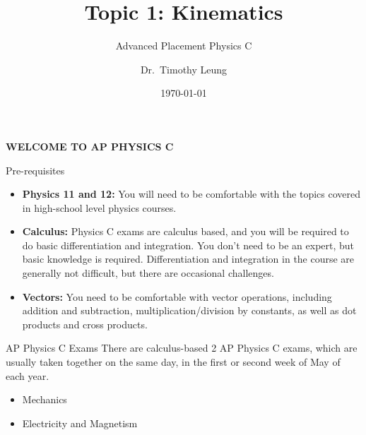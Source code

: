 \documentclass[12pt,compress,aspectratio=169]{beamer}
\title{Topic 1: Kinematics}
\subtitle{Advanced Placement Physics C}
\author[TML]{Dr.\ Timothy Leung}
\institute{Olympiads School}
\date{\today}
\begin{document}
\begin{frame}{}

  {\LARGE
    \begin{center}
      \textbf{WELCOME TO AP PHYSICS C}
    \end{center}
  }
\end{frame}



\begin{frame}{Pre-requisites}
  \begin{itemize}
  \item\textbf{Physics 11 and 12:} You will need to be comfortable with the
    topics covered in high-school level physics courses.
  \item\textbf{Calculus:} Physics C exams are calculus based, and you will be
    required to do basic differentiation and integration. You don't need to be
    an expert, but basic knowledge is required. Differentiation and integration
    in the course are generally not difficult, but there are occasional
    challenges.
  \item\textbf{Vectors:} You need to be comfortable with vector operations,
    including addition and subtraction, multiplication/division by constants,
    as well as dot products and cross products.
  \end{itemize}
\end{frame}



\begin{frame}{AP Physics C Exams}
  There are calculus-based 2 AP Physics C exams, which are usually taken
  together on the same day, in the first or second week of May of each year.
  \begin{itemize}
  \item Mechanics
  \item Electricity and Magnetism
  \end{itemize}
\end{frame}



\end{document}

